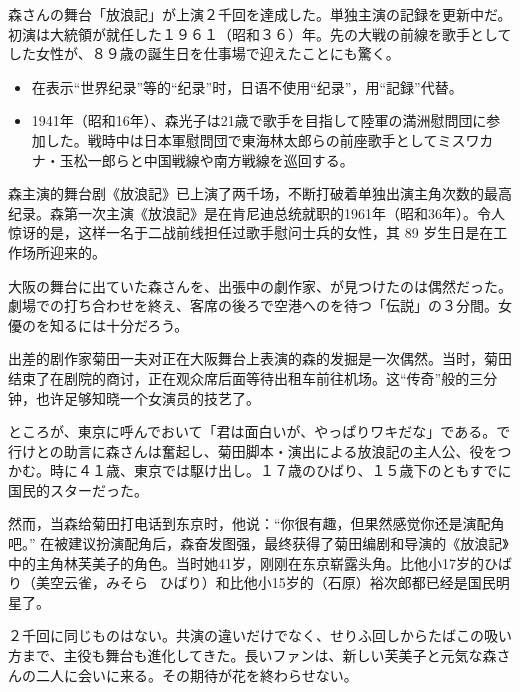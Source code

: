 \documentclass{ctexart}
\newcommand{\bbigbreak}{\bigbreak \bigbreak}
\begin{document}
\bbigbreak

\mincho
森さんの舞台「放浪記」が上演２千回を達成した。単独主演の記録を更新中だ。初演は大統領が就任した１９６１（昭和３６）年。先の大戦の前線を歌手としてした女性が、８９歳の誕生日を仕事場で迎えたことにも驚く。

\begin{itemize}
    \rmfamily
    \item 在表示“世界纪录”等的“纪录”时，日语不使用“纪录”，用“記録”代替。
    \mincho
    \item 1941年（昭和16年）、森光子は21歳で歌手を目指して陸軍の満洲慰問団に参加した。戦時中は日本軍慰問団で東海林太郎らの前座歌手としてミスワカナ・玉松一郎らと中国戦線や南方戦線を巡回する。
\end{itemize}

\rmfamily
森主演的舞台剧《放浪記》已上演了两千场，不断打破着单独出演主角次数的最高纪录。森第一次主演《放浪記》是在肯尼迪总统就职的1961年（昭和36年）。令人惊讶的是，这样一名于二战前线担任过歌手慰问士兵的女性，其 89 岁生日是在工作场所迎来的。

\bbigbreak

\mincho
大阪の舞台に出ていた森さんを、出張中の劇作家、が見つけたのは偶然だった。劇場での打ち合わせを終え、客席の後ろで空港へのを待つ「伝説」の３分間。女優のを知るには十分だろう。

\rmfamily
出差的剧作家菊田一夫对正在大阪舞台上表演的森的发掘是一次偶然。当时，菊田结束了在剧院的商讨，正在观众席后面等待出租车前往机场。这“传奇”般的三分钟，也许足够知晓一个女演员的技艺了。

\bbigbreak

\mincho
ところが、東京に呼んでおいて「君は面白いが、やっぱりワキだな」である。で行けとの助言に森さんは奮起し、菊田脚本・演出による放浪記の主人公、役をつかむ。時に４１歳、東京では駆け出し。１７歳のひばり、１５歳下のともすでに国民的スターだった。

\rmfamily
然而，当森给菊田打电话到东京时，他说：“你很有趣，但果然感觉你还是演配角吧。” 在被建议扮演配角后，森奋发图强，最终获得了菊田编剧和导演的《放浪記》中的主角林芙美子的角色。当时她41岁，刚刚在东京崭露头角。比他小17岁的ひばり（美空云雀，みそら \ ひばり）和比他小15岁的（石原）裕次郎都已经是国民明星了。

\bbigbreak

\mincho
２千回に同じものはない。共演の違いだけでなく、せりふ回しからたばこの吸い方まで、主役も舞台も進化してきた。長いファンは、新しい芙美子と元気な森さんの二人に会いに来る。その期待が花を終わらせない。
\end{document}
